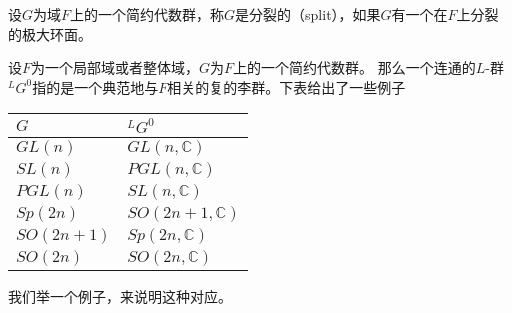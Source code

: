   \begin{definition}
  设$G$为域$F$上的一个简约代数群，称$G$是分裂的（split），如果$G$有一个在$F$上分裂的极大环面。
  \end{definition}

  设$F$为一个局部域或者整体域，$G$为$F$上的一个简约代数群。
  那么一个连通的$L$-群$^LG^0$指的是一个典范地与$F$相关的复的李群。下表给出了一些例子

  \begin{table}[htb]
  \begin{tabular*}{\linewidth}{lp{5cm}}
  \toprule[1.5pt]
  {$G$} & {$^LG^0$} \\\midrule[1pt]
  $GL(n)$ & $GL(n,\mathbb{C})$ \\
  $SL(n)$ & $PGL(n,\mathbb{C})$ \\
  $PGL(n)$ & $SL(n,\mathbb{C})$ \\
  $Sp(2n)$ & $SO(2n+1,\mathbb{C})$ \\
  $SO(2n+1)$ & $Sp(2n,\mathbb{C})$ \\
  $SO(2n)$ & $SO(2n,\mathbb{C})$ \\
  \bottomrule[1.5pt]
  \end{tabular*}
  \end{table}

  我们举一个例子，来说明这种对应。

